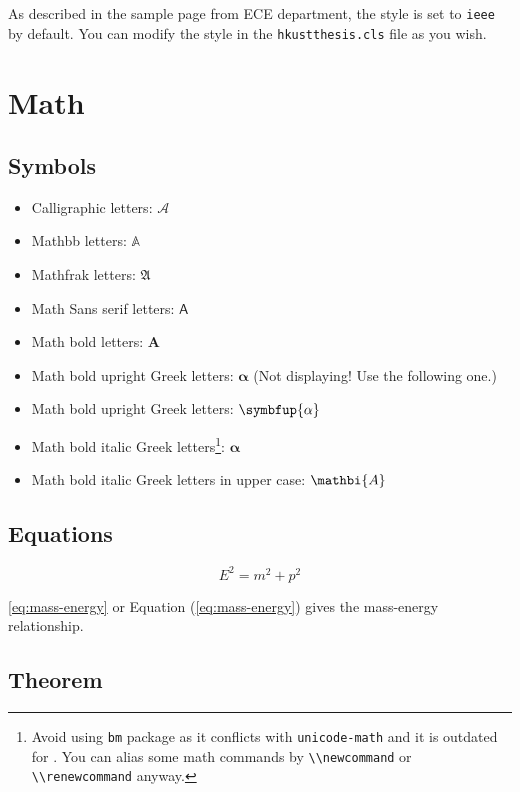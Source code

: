 As described in the sample page from ECE department, the style is set to \lstinline|ieee| by default. You can modify the style in the \lstinline|hkustthesis.cls| file as you wish.

\section{Math}

\subsection{Symbols}

\begin{itemize}
  \item Calligraphic letters: $\mathcal{A}$
  \item Mathbb letters: $\mathbb{A}$
  \item Mathfrak letters: $\mathfrak{A}$
  \item Math Sans serif letters: $\mathsf{A}$
  \item Math bold letters: $\mathbf{A}$
  \item Math bold upright Greek letters: $\mathbf{\alpha}$ (Not displaying! Use the following one.)
  \item Math bold upright Greek letters: $\symbfup{\alpha}$
\item Math bold italic Greek letters\footnote{Avoid using \lstinline|bm| package as it conflicts with \lstinline|unicode-math| and it is outdated for . You can alias some math commands by \lstinline|\\newcommand| or \lstinline|\\renewcommand| anyway.}: $\bm{\alpha}$
  \item Math bold italic Greek letters in upper case: $\mathbi{A}$
\end{itemize}

\subsection{Equations}

\begin{equation}
  E^2 = m^2 + p^2\label{eq:mass-energy}
\end{equation}

\cref{eq:mass-energy} or Equation (\ref{eq:mass-energy}) gives the mass-energy relationship.

\subsection{Theorem}

